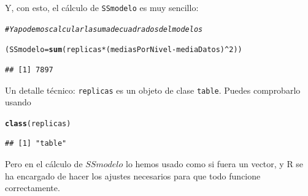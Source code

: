 \documentclass[10pt,a4paper]{article}\usepackage[]{graphicx}\usepackage[]{color}
\makeatletter
\newcommand{\hlnum}[1]{\textcolor[rgb]{0.686,0.059,0.569}{#1}}%
\newcommand{\hlcom}[1]{\textcolor[rgb]{0.678,0.584,0.686}{\textit{#1}}}%
\newcommand{\hlopt}[1]{\textcolor[rgb]{0,0,0}{#1}}%
\newcommand{\hlstd}[1]{\textcolor[rgb]{0.345,0.345,0.345}{#1}}%
\newcommand{\hlkwb}[1]{\textcolor[rgb]{0.69,0.353,0.396}{#1}}%
\newcommand{\hlkwd}[1]{\textcolor[rgb]{0.737,0.353,0.396}{\textbf{#1}}}%
\newenvironment{kframe}{%
 \def\at@end@of@kframe{}%
 \ifinner\ifhmode%
  \def\at@end@of@kframe{\end{minipage}}%
  \begin{minipage}{\columnwidth}%
 \fi\fi%
 \def\FrameCommand##1{\hskip\@totalleftmargin \hskip-\fboxsep
 \colorbox{shadecolor}{##1}\hskip-\fboxsep
     \hskip-\linewidth \hskip-\@totalleftmargin \hskip\columnwidth}%
 \MakeFramed {\advance\hsize-\width
   \@totalleftmargin\z@ \linewidth\hsize
   \@setminipage}}%
 {\par\unskip\endMakeFramed%
 \at@end@of@kframe}
\newenvironment{knitrout}{}{} %
\makeatother
\begin{document}
Y, con esto, el cálculo de {\tt SSmodelo} es muy sencillo:

\begin{knitrout}
\color{fgcolor}\begin{kframe}
\begin{alltt}
\hlcom{# Ya podemos  calcular la suma de cuadrados del modelos}

\hlstd{(SSmodelo} \hlkwb{=} \hlkwd{sum}\hlstd{( replicas} \hlopt{*} \hlstd{(mediasPorNivel}\hlopt{-}\hlstd{mediaDatos)}\hlopt{^}\hlnum{2}  \hlstd{) )}
\end{alltt}
\begin{verbatim}
## [1] 7897
\end{verbatim}
\end{kframe}
\end{knitrout}


Un detalle técnico:  {\tt replicas} es un objeto de clase {\tt table}. Puedes comprobarlo usando
\begin{knitrout}
\color{fgcolor}\begin{kframe}
\begin{alltt}
\hlkwd{class}\hlstd{(replicas)}
\end{alltt}
\begin{verbatim}
## [1] "table"
\end{verbatim}
\end{kframe}
\end{knitrout}
Pero en el cálculo de $SSmodelo$ lo hemos usado como si fuera un vector, y R se ha encargado de hacer los ajustes necesarios para que todo funcione correctamente.
\end{document}
